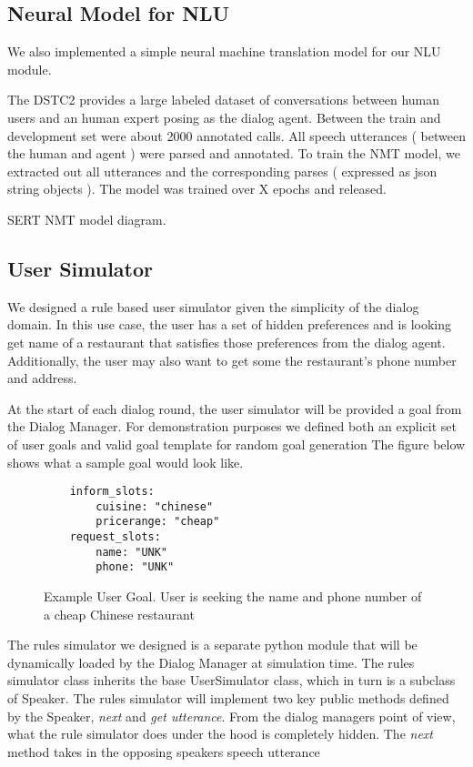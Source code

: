 \subsection{Neural Model for NLU}

We also implemented a simple neural machine translation model for our NLU module. 

The DSTC2 provides a large labeled dataset of conversations between human users and an human expert posing as the dialog agent. Between the train and development set were about 2000 annotated calls. All speech utterances ( between the human and agent ) were parsed and annotated. To train the NMT model, we extracted out all utterances and the corresponding parses ( expressed as json string objects ). The model was trained over X epochs and released.

SERT NMT model diagram.


\subsection{User Simulator}

We designed a rule based user simulator given the simplicity of the dialog domain. In this use case, the user has a set of hidden preferences and is looking get name of a restaurant that satisfies those preferences from the dialog agent. Additionally, the user may also want to get some the restaurant's phone number and address.

At the start of each dialog round, the user simulator will be provided a goal from the Dialog Manager. For demonstration purposes we defined both an explicit set of user goals  and valid goal template for random goal generation The figure below shows what a sample goal would look like. 

\begin{figure}[h!]
	\caption{ Example User Goal. User is seeking the name and phone number of a cheap Chinese restaurant}
	\label{fig:ex_user_goal}
	\begin{lstlisting}
	inform_slots:
		cuisine: "chinese"
		pricerange: "cheap"
	request_slots:
		name: "UNK"
		phone: "UNK"	
	\end{lstlisting}
\end{figure}

The rules simulator we designed is a separate python module that will be dynamically loaded by the Dialog Manager at simulation time. The rules simulator class inherits the base UserSimulator class, which in turn is a subclass of Speaker. The rules simulator will implement two key public methods defined by the Speaker, \textit{next} and \textit{get utterance}. From the dialog managers point of view, what the rule simulator does under the hood is completely hidden. The \textit{next} method takes in the opposing speakers speech utterance 

